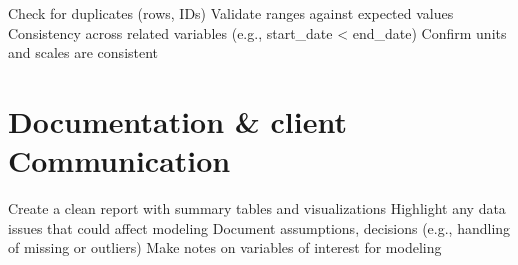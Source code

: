 \documentclass[
  11pt,
  letterpaper,
  DIV=11,
  numbers=noendperiod]{scrartcl}
\begin{document}
Check for duplicates (rows, IDs) Validate ranges against expected values
Consistency across related variables (e.g., start\_date \textless{}
end\_date) Confirm units and scales are consistent

\section{Documentation \& client
Communication}\label{documentation-client-communication}

Create a clean report with summary tables and visualizations Highlight
any data issues that could affect modeling Document assumptions,
decisions (e.g., handling of missing or outliers) Make notes on
variables of interest for modeling
\end{document}
